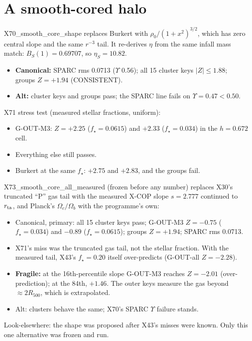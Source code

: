 \documentclass[10pt]{article}
\begin{document}
\section{A smooth-cored halo}
X70\_smooth\_core\_shape replaces Burkert with $\rho_0/(1+x^2)^{3/2}$, which has zero central slope and the same $r^{-3}$ tail. It re-derives $\eta$ from the same infall mass match: $B_S(1)=0.69707$, so $\eta_S=10.82$.
\begin{itemize}
\item \textbf{Canonical:} SPARC rms 0.0713 ($\Upsilon$ 0.56); all 15 cluster keys $|Z|\le1.88$; groups $Z=+1.94$ (CONSISTENT).
\item \textbf{Alt:} cluster keys and groups pass; the SPARC line fails on $\Upsilon=0.47<0.50$.
\end{itemize}
X71 stress test (measured stellar fractions, uniform):
\begin{itemize}
\item G-OUT-M3: $Z=+2.25$ ($f_\star=0.0615$) and $+2.33$ ($f_\star=0.034$) in the $h=0.672$ cell.
\item Everything else still passes.
\item Burkert at the same $f_\star$: $+2.75$ and $+2.83$, and the groups fail.
\end{itemize}
X73\_smooth\_core\_all\_measured (frozen before any number) replaces X30's truncated ``P'' gas tail with the measured X-COP slope $s=2.777$ continued to $r_{\rm ta}$, and Planck's $\Omega_c/\Omega_b$ with the programme's own:
\begin{itemize}
\item Canonical, primary: all 15 cluster keys pass; G-OUT-M3 $Z=-0.75$ ($f_\star=0.034$) and $-0.89$ ($f_\star=0.0615$); groups $Z=+1.94$; SPARC rms 0.0713.
\item X71's miss was the truncated gas tail, not the stellar fraction. With the measured tail, X43's $f_\star=0.20$ itself over-predicts (G-OUT-all $Z=-2.28$).
\item \textbf{Fragile:} at the 16th-percentile slope G-OUT-M3 reaches $Z=-2.01$ (over-prediction); at the 84th, $+1.46$. The outer keys measure the gas beyond $\approx2R_{500}$, which is extrapolated.
\item Alt: clusters behave the same; X70's SPARC $\Upsilon$ failure stands.
\end{itemize}
Look-elsewhere: the shape was proposed after X43's misses were known. Only this one alternative was frozen and run.
\end{document}
